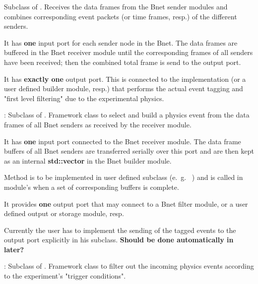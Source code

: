 \begin{description}
Subclass of . 
   Receives the data frames from the Bnet sender modules and 
   combines corresponding event packets (or time frames, resp.) of the different senders.
\begin{compactenum}
  \item It has {\bf one} input port for each sender node in the Bnet. 
      The data frames are buffered in the Bnet receiver module until the 
      corresponding frames of all senders have been received; then the 
      combined total frame is send to the output port.
  \item It has {\bf exactly one} output port. This is connected to the 
       implementation (or a user defined builder module, resp.) 
      that performs the actual event tagging and "first level filtering" 
      due to the experimental physics.   
\end{compactenum}
\item[\class{bnet::BuilderModule}] : 
	Subclass of . 
   Framework class to select and build a physics event from 
   the data frames of all Bnet senders as received by the receiver module.
\begin{compactenum}
  \item It has {\bf one} input port connected to the Bnet receiver module. 
      The data frame buffers of all Bnet senders are transferred serially 
      over this port and are then kept as an internal {\bf std::vector} in the Bnet builder module.
  \item Method  is to be implemented in user defined 
      subclass (e.~g.~ ) and is called in module's 
       when a set of corresponding buffers is complete.
  \item It provides {\bf one} output port that may connect to a 
      Bnet filter module, or a user defined output or storage module, resp. 
  \item Currently the user has to implement the sending of the tagged 
      events to the output port explicitly in his subclass. 
      {\bf Should be done automatically in  later?}   
\end{compactenum}
\item[\class{bnet::FilterModule}] : 
Subclass of . 
   Framework class to filter out the incoming physics events 
   according to the experiment's "trigger conditions". 

\end{description}
